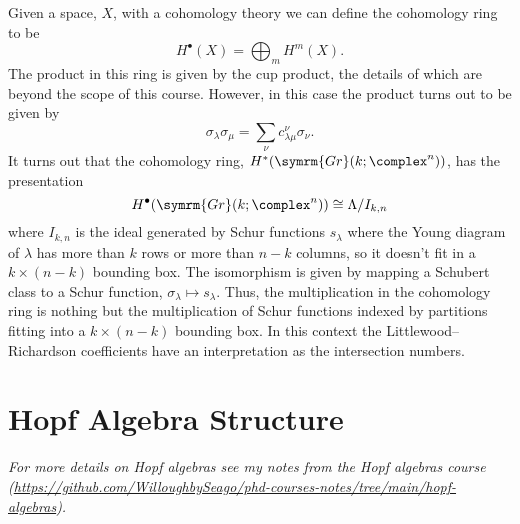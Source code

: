 \documentclass[fleqn]{NotesClass}
\newcommand{\isomorphic}{\cong}
\newcommand{\Gr}{\symrm{Gr}}
\begin{document}
    
    Given a space, \(X\), with a cohomology theory we can define the cohomology ring to be
    \begin{equation}
        H^{\bullet}(X) = \bigoplus_m H^m(X).
    \end{equation}
    The product in this ring is given by the cup product, the details of which are beyond the scope of this course.
    However, in this case the product turns out to be given by
    \begin{equation}
        \sigma_\lambda \sigma_\mu = \sum_\nu c^{\nu}_{\lambda\mu} \sigma_\nu.
    \end{equation}
    It turns out that the cohomology ring, \(H^*(\Gr(k; \complex^n))\), has the presentation
    \begin{equation}
        H^{\bullet}(\Gr(k; \complex^n)) \isomorphic \Lambda / I_{k,n}
    \end{equation}
    where \(I_{k,n}\) is the ideal generated by Schur functions \(s_\lambda\) where the Young diagram of \(\lambda\) has more than \(k\) rows or more than \(n - k\) columns, so it doesn't fit in a \(k \times (n - k)\) bounding box.
    The isomorphism is given by mapping a Schubert class to a Schur function, \(\sigma_\lambda \mapsto s_\lambda\).
    Thus, the multiplication in the cohomology ring is nothing but the multiplication of Schur functions indexed by partitions fitting into a \(k \times (n - k)\) bounding box.
    In this context the Littlewood--Richardson coefficients have an interpretation as the intersection numbers.
    
    \section{Hopf Algebra Structure}
    \textit{For more details on Hopf algebras see my notes from the Hopf algebras course (\url{https://github.com/WilloughbySeago/phd-courses-notes/tree/main/hopf-algebras}).}
    
\end{document}
